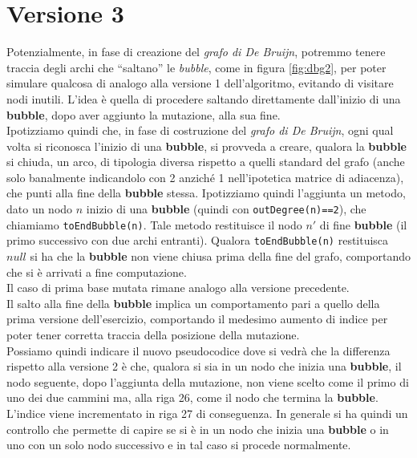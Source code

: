 \documentclass[a4paper,12pt, oneside]{book}
\begin{document}
\section{Versione 3}
Potenzialmente, in fase di creazione del \textit{grafo di De Bruijn}, potremmo
tenere traccia degli archi che ``saltano'' le \textit{bubble}, come in figura
\ref{fig:dbg2}, per poter simulare qualcosa di analogo alla versione 1
dell'algoritmo, evitando di visitare nodi inutili. L'idea è quella di procedere
saltando direttamente dall'inizio di una \textbf{bubble}, dopo aver aggiunto la
mutazione, alla sua fine. \\
Ipotizziamo quindi che, in fase di costruzione del \textit{grafo di De Bruijn},
ogni qual volta si riconosca l'inizio di una \textbf{bubble}, si provveda a
creare, qualora la \textbf{bubble} si chiuda, un arco, di tipologia
diversa rispetto a quelli standard del grafo (anche solo banalmente indicandolo
con 2 anziché 1 nell'ipotetica matrice di adiacenza), che punti alla fine della
\textbf{bubble} stessa. Ipotizziamo quindi l'aggiunta un metodo, dato un
nodo $n$ inizio di una \textbf{bubble} (quindi con \texttt{outDegree(n)==2}),
che chiamiamo
\texttt{toEndBubble(n)}. Tale metodo restituisce il nodo $n'$ di fine
\textbf{bubble} (il primo successivo con due archi entranti). Qualora
\texttt{toEndBubble(n)} restituisca $null$ si ha che la \textbf{bubble} non
viene chiusa prima della fine del grafo, comportando che si è arrivati a fine
computazione.\\  
Il caso di prima base mutata rimane analogo alla versione precedente.\\
Il salto alla fine della \textbf{bubble} implica un comportamento pari a quello
della prima versione dell'esercizio, comportando il medesimo aumento di indice
per poter tener corretta traccia della posizione della mutazione.\\
Possiamo quindi indicare il nuovo pseudocodice dove si vedrà che  la differenza
rispetto alla versione 2 è che, qualora si sia in un 
nodo che inizia una \textbf{bubble}, il nodo seguente, dopo l'aggiunta della
mutazione, non viene scelto come il primo di uno dei due cammini ma, alla riga
26, come il nodo che termina la \textbf{bubble}. L'indice viene incrementato in
riga 27 di conseguenza. In generale si ha quindi un controllo che permette di
capire se si è in un nodo che inizia una \textbf{bubble} o in uno con un solo
nodo successivo e in tal caso si procede normalmente.
\end{document}
